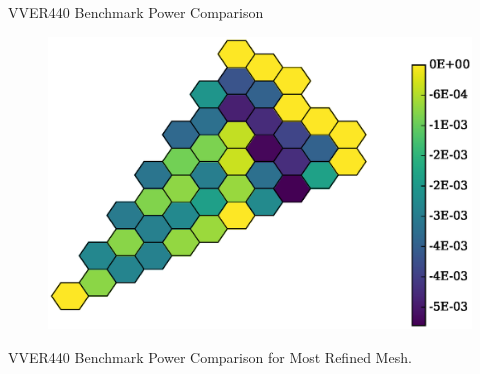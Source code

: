 \begin{frame}{VVER440 Benchmark Power Comparison}
  \begin{figure}
    \centering
    \includegraphics[width=\textwidth]{./figs/diffusion_vver440_colored}
    \label{fig:diffusion_vver440}
  \end{figure}
  \vspace{-0.5in}
  \begin{center}
    {VVER440 Benchmark Power Comparison for Most Refined Mesh.}
  \end{center}
\end{frame}

